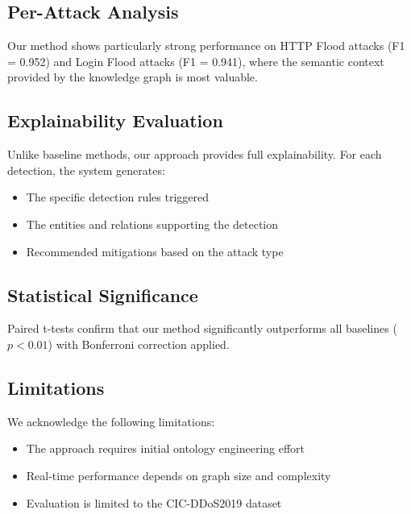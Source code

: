 \documentclass[preprint,12pt]{elsarticle}
\begin{document}
\subsection{Per-Attack Analysis}

Our method shows particularly strong performance on HTTP Flood attacks (F1 = 0.952) and Login Flood attacks (F1 = 0.941), where the semantic context provided by the knowledge graph is most valuable.

\subsection{Explainability Evaluation}

Unlike baseline methods, our approach provides full explainability. For each detection, the system generates:

\begin{itemize}
    \item The specific detection rules triggered
    \item The entities and relations supporting the detection
    \item Recommended mitigations based on the attack type
\end{itemize}

\subsection{Statistical Significance}

Paired t-tests confirm that our method significantly outperforms all baselines ($p < 0.01$) with Bonferroni correction applied.

\subsection{Limitations}

We acknowledge the following limitations:

\begin{itemize}
    \item The approach requires initial ontology engineering effort
    \item Real-time performance depends on graph size and complexity
    \item Evaluation is limited to the CIC-DDoS2019 dataset
\end{itemize}

\end{document}
